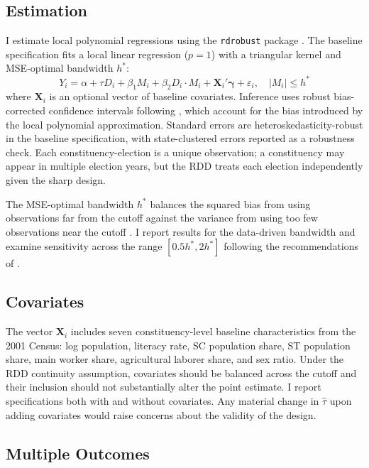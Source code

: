 \documentclass[12pt]{article}
\begin{document}
\subsection{Estimation}

I estimate local polynomial regressions using the \texttt{rdrobust} package \citep{calonico2014,calonico2020}. The baseline specification fits a local linear regression ($p=1$) with a triangular kernel and MSE-optimal bandwidth $h^*$:
\begin{equation}
Y_i = \alpha + \tau D_i + \beta_1 M_i + \beta_2 D_i \cdot M_i + \mathbf{X}_i'\boldsymbol{\gamma} + \varepsilon_i, \quad |M_i| \leq h^*
\label{eq:estimation}
\end{equation}
where $\mathbf{X}_i$ is an optional vector of baseline covariates. Inference uses robust bias-corrected confidence intervals following \citet{calonico2014}, which account for the bias introduced by the local polynomial approximation. Standard errors are heteroskedasticity-robust in the baseline specification, with state-clustered errors reported as a robustness check. Each constituency-election is a unique observation; a constituency may appear in multiple election years, but the RDD treats each election independently given the sharp design.

The MSE-optimal bandwidth $h^*$ balances the squared bias from using observations far from the cutoff against the variance from using too few observations near the cutoff \citep{ImbensKalyanaraman2012,calonico2020}. I report results for the data-driven bandwidth and examine sensitivity across the range $[0.5 h^*, 2 h^*]$ following the recommendations of \citet{cattaneo2020practical}.

\subsection{Covariates}

The vector $\mathbf{X}_i$ includes seven constituency-level baseline characteristics from the 2001 Census: log population, literacy rate, SC population share, ST population share, main worker share, agricultural laborer share, and sex ratio. Under the RDD continuity assumption, covariates should be balanced across the cutoff and their inclusion should not substantially alter the point estimate. I report specifications both with and without covariates. Any material change in $\hat{\tau}$ upon adding covariates would raise concerns about the validity of the design.

\subsection{Multiple Outcomes}
\end{document}
